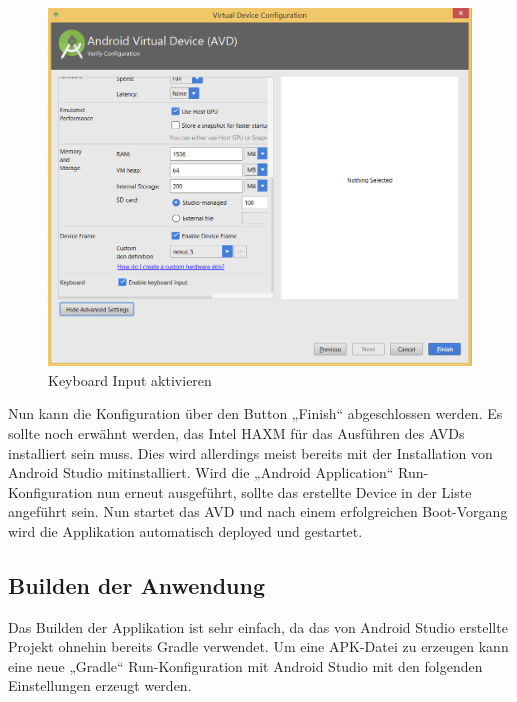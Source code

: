 \begin{figure}[H]
	\begin{center}
		\includegraphics[width=1.0\linewidth]{images/key_input.png}
		\caption{Keyboard Input aktivieren}
		\label{Keyboard Input aktivieren}
	\end{center}
\end{figure}

Nun kann die Konfiguration über den Button „Finish“ abgeschlossen werden. Es sollte noch erwähnt werden, das Intel HAXM für das Ausführen des AVDs installiert sein muss. Dies wird allerdings meist bereits mit der Installation von Android Studio mitinstalliert.
Wird die „Android Application“ Run-Konfiguration nun erneut ausgeführt, sollte das erstellte Device in der Liste angeführt sein. Nun startet das AVD und nach einem erfolgreichen Boot-Vorgang wird die Applikation automatisch deployed und gestartet.

\subsection{Builden der Anwendung}
\label{subsec:Builden der Anwendung}
Das Builden der Applikation ist sehr einfach, da das von Android Studio erstellte Projekt ohnehin bereits Gradle verwendet. Um eine APK-Datei zu erzeugen kann eine neue „Gradle“ Run-Konfiguration mit Android Studio mit den folgenden Einstellungen erzeugt werden.


